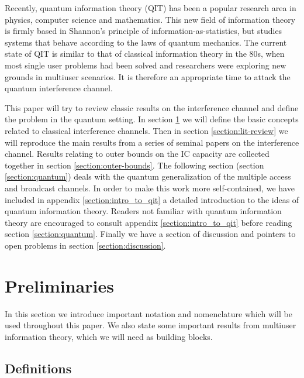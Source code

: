 \documentclass[aps,11pt,twoside,letterpaper]{article}
\begin{document}
    Recently, quantum information theory (QIT) has been a popular research area in physics,
    computer science and mathematics. This new field of information theory is firmly based
    in Shannon's principle of information-as-statistics, but studies systems that behave 
    according to the laws of quantum mechanics.
    The current state of QIT is similar to that of classical information theory in the 80s,
    when most single user problems had been solved and researchers were exploring new
    grounds in multiuser scenarios.
    It is therefore an appropriate time to attack the quantum interference channel.

    
    This paper will try to review classic results on the interference channel and
    define the problem in the quantum setting.
    In section \ref{Preliminaries} we will define the basic concepts related to 
    classical interference channels.
    Then in section \ref{section:lit-review} we will reproduce the main results
    from a series of seminal papers on the interference channel.
    Results relating to outer bounds on the IC capacity are collected together
    in section  \ref{section:outer-bounds}.
    The following section (section \ref{section:quantum}) deals with the quantum generalization of the
    multiple access and broadcast channels. 
    	In order to make this work more self-contained, we have included
	in appendix \ref{section:intro_to_qit} a detailed introduction to 
	the ideas of quantum information theory.  Readers not familiar with quantum information theory are encouraged 
    to consult appendix \ref{section:intro_to_qit} before reading section \ref{section:quantum}.
    Finally we have a section of discussion and pointers to open problems in section  \ref{section:discussion}.

    
    
    
 \section{Preliminaries}  \label{Preliminaries} 

    In this section we introduce important notation and nomenclature which will
    be used throughout this paper.
    We also state some important results from multiuser information theory,
    which we will need as building blocks.

    \subsection{Definitions}
	
\end{document}
